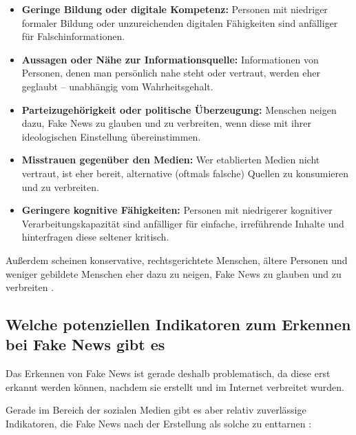 \begin{itemize}
    \item \textbf{Geringe Bildung oder digitale Kompetenz:} Personen mit niedriger formaler Bildung oder unzureichenden digitalen Fähigkeiten sind anfälliger für Falschinformationen.
    
    \item \textbf{Aussagen oder Nähe zur Informationsquelle:} Informationen von Personen, denen man persönlich nahe steht oder vertraut, werden eher geglaubt – unabhängig vom Wahrheitsgehalt.
    
    \item \textbf{Parteizugehörigkeit oder politische Überzeugung:} Menschen neigen dazu, Fake News zu glauben und zu verbreiten, wenn diese mit ihrer ideologischen Einstellung übereinstimmen.
    
    \item \textbf{Misstrauen gegenüber den Medien:} Wer etablierten Medien nicht vertraut, ist eher bereit, alternative (oftmals falsche) Quellen zu konsumieren und zu verbreiten.
    
    \item \textbf{Geringere kognitive Fähigkeiten:} Personen mit niedrigerer kognitiver Verarbeitungskapazität sind anfälliger für einfache, irreführende Inhalte und hinterfragen diese seltener kritisch.
\end{itemize}

Außerdem scheinen konservative, rechtsgerichtete Menschen, ältere Personen und weniger gebildete Menschen eher dazu zu neigen, Fake News zu glauben und zu verbreiten \cite{socsci9100185}.

\subsection{Welche potenziellen Indikatoren zum Erkennen bei Fake News gibt es}
\label{sec:potenzielle_indikatoren}

Das Erkennen von Fake News ist gerade deshalb problematisch, da diese erst erkannt werden können, nachdem sie erstellt und im Internet verbreitet wurden. \cite{Sharma:2024}

Gerade im Bereich der sozialen Medien gibt es aber relativ zuverlässige Indikatoren, die Fake News nach der Erstellung als solche zu enttarnen \cite{Hartwig2021}:

